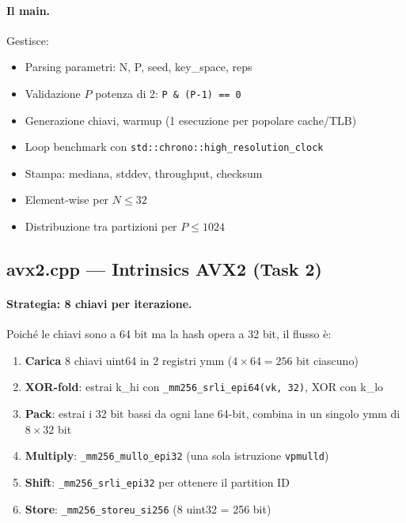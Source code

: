 \documentclass[11pt,a4paper]{article}
\begin{document}
\paragraph{Il main.} Gestisce:
\begin{itemize}
    \item Parsing parametri: N, P, seed, key\_space, reps
    \item Validazione $P$ potenza di 2: \texttt{P \& (P-1) == 0}
    \item Generazione chiavi, warmup (1 esecuzione per popolare cache/TLB)
    \item Loop benchmark con \texttt{std::chrono::high\_resolution\_clock}
    \item Stampa: mediana, stddev, throughput, checksum
    \item Element-wise per $N \leq 32$
    \item Distribuzione tra partizioni per $P \leq 1024$
\end{itemize}


\subsection{avx2.cpp --- Intrinsics AVX2 (Task 2)}

\paragraph{Strategia: 8 chiavi per iterazione.}
Poiché le chiavi sono a 64 bit ma la hash opera a 32 bit, il flusso è:
\begin{enumerate}
    \item \textbf{Carica} 8 chiavi uint64 in 2 registri ymm ($4 \times 64 = 256$ bit ciascuno)
    \item \textbf{XOR-fold}: estrai k\_hi con \texttt{\_mm256\_srli\_epi64(vk, 32)}, XOR con k\_lo
    \item \textbf{Pack}: estrai i 32 bit bassi da ogni lane 64-bit, combina in un singolo ymm di $8 \times 32$ bit
    \item \textbf{Multiply}: \texttt{\_mm256\_mullo\_epi32} (una sola istruzione \texttt{vpmulld})
    \item \textbf{Shift}: \texttt{\_mm256\_srli\_epi32} per ottenere il partition ID
    \item \textbf{Store}: \texttt{\_mm256\_storeu\_si256} (8 uint32 = 256 bit)
\end{enumerate}
\end{document}

